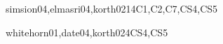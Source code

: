 \begin{syllabus}
\begin{unit}{\IMDataModeling}{}{simsion04,elmasri04,korth02}{14}{C1,C2,C7,CS4,CS5}
\begin{topics}
    \item \IMDataModelingTopicData
    \item \IMDataModelingTopicConceptual
    \item \IMDataModelingTopicSpreadsheet
    \item \IMDataModelingTopicRelational
    \item \IMDataModelingTopicObject
    \item \IMDataModelingTopicSemi
\end{topics}
\begin{learningoutcomes}
    \item \IMDataModelingLOCompareAndData [\Usage]  
    \item \IMDataModelingLODescribeConcepts [\Usage]
    \item \IMDataModelingLODefineTheUsed [\Usage]
    \item \IMDataModelingLODescribeTheOfData [\Usage]
    \item \IMDataModelingLOApplyTheAnd [\Usage]
    \item \IMDataModelingLODescribeTheOfModel [\Usage]
    \item \IMDataModelingLODescribeTheRelational [\Usage]
    \item \IMDataModelingLOGiveAEquivalent [\Usage]
\end{learningoutcomes}
\end{unit}

\begin{unit}{\IMIndexing}{}{whitehorn01,date04,korth02}{4}{CS4,CS5}
\begin{topics}
    \item \IMIndexingTopicThe
    \item \IMIndexingTopicTheBasic
    \item \IMIndexingTopicKeeping
    \item \IMIndexingTopicCreating
    \item \IMIndexingTopicIndexing
    \item \IMIndexingTopicIndexingThe
\end{topics}
\begin{learningoutcomes}
    \item \IMIndexingLOGenerateAn [\Usage]
    \item \IMIndexingLOExplainTheAn [\Usage] 
    \item \IMIndexingLOExplainHowStop [\Usage]
    \item \IMIndexingLOIdentifyAppropriate [\Usage]
    \item \IMIndexingLOEstimate [\Usage]
    \item \IMIndexingLODescribeKey [\Usage]
\end{learningoutcomes}
\end{unit}


\end{syllabus}
